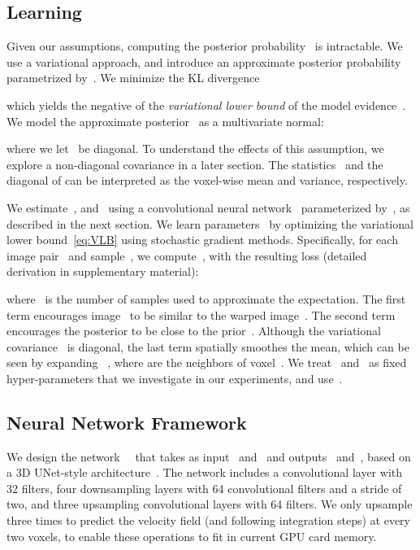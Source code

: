 \documentclass{article}
\newcommand{\citep}{\cite}
\begin{document}
\vspace{-0.1cm}
\subsection{Learning}


Given our assumptions, computing the posterior probability~ is intractable. We use a variational approach, and introduce an approximate posterior probability~ parametrized by~. We minimize the KL divergence

which yields the negative of the \textit{variational lower bound} of the model evidence~\citep{kingma2013}.
We model the approximate posterior~ as a multivariate normal:

where we let~ be diagonal. To understand the effects of this assumption, we explore a non-diagonal covariance in a later section. The statistics~ and the diagonal of  can be interpreted as the voxel-wise mean and variance, respectively. 



We estimate~, and~ using a convolutional neural network~ parameterized by~, as described in the next section.
We learn parameters~ by optimizing the variational lower bound~\eqref{eq:VLB} using stochastic gradient methods. Specifically, for each image pair~ and sample~, we compute~,
with the resulting loss (detailed derivation in supplementary material):

where~ is the number of samples used to approximate the expectation. 
The first term encourages image~ to be similar to the warped image~. The second term encourages the posterior to be close to the prior~. Although the variational covariance~ is diagonal, the last term spatially smoothes the mean, which can be seen by expanding
~,
where
 are the neighbors of voxel~. We treat~ and~ as fixed hyper-parameters that we investigate in our experiments, and use~.



\subsection{Neural Network Framework}




We design the network~~ that takes as input~ and~ and outputs~ and~, based on a 3D UNet-style architecture~\citep{ronneberger2015}. {\color{blue}The network includes a convolutional layer with 32 filters, four downsampling layers with 64 convolutional filters and a stride of two, and three upsampling convolutional layers with 64 filters. We only upsample three times to predict the velocity field (and following integration steps) at every two voxels, to enable these operations to fit in current GPU card memory.}
\end{document}

